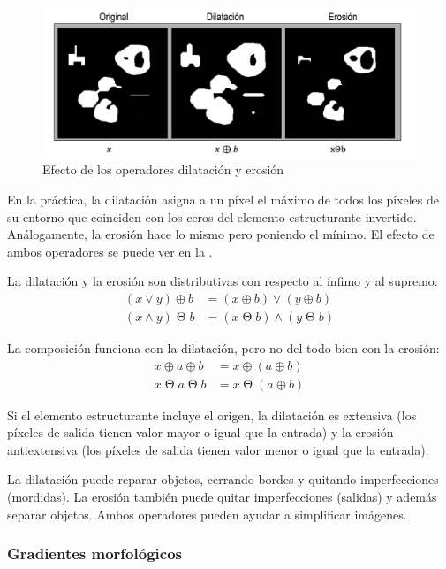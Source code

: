 \documentclass[nochap,palatino,notitlepage]{apuntes}
\DeclareMathOperator{\erd}{\Theta}
\begin{document}
\begin{figure}[hbtp]
\centering
\includegraphics[width=1\textwidth]{img/DilatacionErosion.png}
\caption{Efecto de los operadores dilatación y erosión}
\label{fig:DilatacionErosion}
\end{figure}

En la práctica, la dilatación asigna a un píxel el máximo de todos los píxeles de su entorno que coinciden con los ceros del elemento estructurante invertido. Análogamente, la erosión hace lo mismo pero poniendo el mínimo. El efecto de ambos operadores se puede ver en la .

La dilatación y la erosión son distributivas con respecto al ínfimo y al supremo:
\begin{align*}
(x \vee y) \oplus b &= (x\oplus b) \vee (y \oplus b) \\
(x \wedge y) \erd b &= (x\erd b) \wedge (y \erd b)
\end{align*}

La composición funciona con la dilatación, pero no del todo bien con la erosión:
\begin{align*}
x \oplus a \oplus b &= x \oplus (a \oplus b) \\
x \erd a \erd b &= x \erd (a \oplus b)
\end{align*}

Si el elemento estructurante incluye el origen, la dilatación es extensiva (los píxeles de salida tienen valor mayor o igual que la entrada) y la erosión antiextensiva (los píxeles de salida tienen valor menor o igual que la entrada).

La dilatación puede reparar objetos, cerrando bordes y quitando imperfecciones (mordidas). La erosión también puede quitar imperfecciones (salidas) y además separar objetos. Ambos operadores pueden ayudar a simplificar imágenes.

\subsubsection{Gradientes morfológicos}
\end{document}
